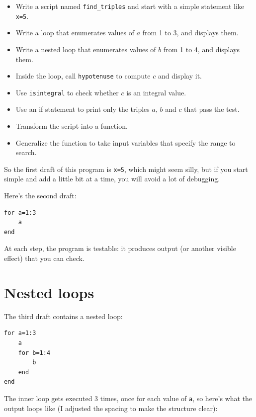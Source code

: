 \documentclass{book}
\begin{document}
\begin{itemize}

\item Write a script named {\tt find\_triples} and start with a simple
statement like {\tt x=5}.

\item Write a loop that enumerates values of $a$ from 1 to 3, and
displays them.

\item Write a nested loop that enumerates values of $b$ from 1 to 4,
and displays them.

\item Inside the loop, call {\tt hypotenuse} to compute $c$ and
display it.

\item Use {\tt isintegral} to check whether $c$ is an integral
value.

\item Use an if statement to print only the triples $a$, $b$ and $c$
that pass the test.

\item Transform the script into a function.

\item Generalize the function to take input variables that
specify the range to search.

\end{itemize}

So the first draft of this program is {\tt x=5}, which might seem
silly, but if you start simple and add a little bit at a time, you
will avoid a lot of debugging.

Here's the second draft:

\begin{verbatim}
for a=1:3
    a
end
\end{verbatim}

At each step, the program is testable: it produces output (or another
visible effect) that you can check.


\section{Nested loops}

The third draft contains a nested loop:

\begin{verbatim}
for a=1:3
    a
    for b=1:4
        b
    end
end
\end{verbatim}

The inner loop gets executed 3 times, once for each value of {\tt a},
so here's what the output loops like (I adjusted the spacing to make
the structure clear):
\end{document}
